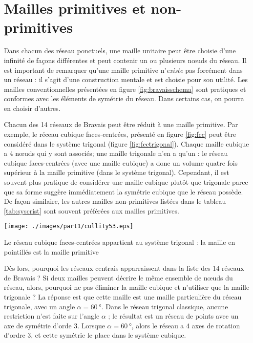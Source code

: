 \section{Mailles primitives et non-primitives}

Dans chacun des réseau ponctuels, une maille unitaire peut être choisie d'une
infinité de façons différentes et peut contenir un ou plusieurs nœuds du réseau.
Il est important de remarquer qu'une maille primitive n'\emph{existe} pas
forcément dans un réseau : il s'agit d'une construction mentale et est choisie
pour son utilité. Les mailles conventionnelles présentées en figure
\ref{fig:bravaisschema} sont pratiques et conformes avec les éléments de symétrie
du réseau. Dans certains cas, on pourra en choisir d'autres.

Chacun des 14 réseaux de Bravais peut être réduit à une maille primitive. Par
exemple, le réceau cubique faces-centrées, présenté en figure \ref{fig:fcc} peut
être considéré dans le système trigonal (figure \ref{fig:fcctrigonal}). Chaque
maille cubique a 4 nœuds qui y sont associés; une maille trigonale n'en a qu'un :
le réseau cubique faces-centrées (avec une maille cubique) a donc un
volume quatre fois supérieur à la maille primitive (dans le système trigonal).
Cependant, il est souvent plus pratique de considérer une maille cubique plutôt
que trigonale parce que sa forme suggère immédiatement la symétrie cubique que le
réseau possède. De façon similaire, les autres mailles non-primitives listées
dans le tableau \ref{tab:syscrist} sont souvent préférées aux mailles primitives.

\begin{marginfigure}
    \texttt{[image: ./images/part1/cullity53.eps]}
    \caption{Le réseau cubique faces-centrées appartient au système trigonal : la
    maille en pointillés est la maille primitive}
    \label{fig:fcctrigonal}
\end{marginfigure}

Dès lors, pourquoi les réseaux centrais apparraissent dans la liste des 14
réseaux de Bravais ? Si deux mailles peuvent décrire le même ensemble de nœuds du
réseau, alors, pourquoi ne pas éliminer la maille cubique et n'utiliser que la
maille trigonale ? La réponse est que cette maille est une maille particulière du
réseau trigonale, avec un angle $\alpha = \SI{60}{\degree}$. Dans le réseau
trigonal classique, aucune restriction n'est faite sur l'angle $\alpha$ ; le
résultat est un réseau de points avec un axe de symétrie d'orde 3. Lorsque
$\alpha = \SI{60}{\degree}$, alors le réseau a 4 axes de rotation d'ordre 3, et
cette symétrie le place dans le système cubique.

